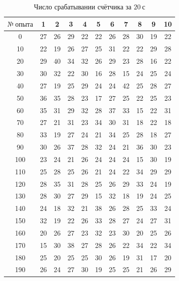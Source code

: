 \documentclass[a4paper, 12pt]{article}
\begin{document}
    \begin{table}[ht!]
    	\begin{center}
    		\begin{tabular}{|c|c|c|c|c|c|c|c|c|c|c|}
    			\hline
    			$№ \ опыта$ & 1  & 2  & 3  & 4  & 5  & 6  & 7  & 8  & 9  & 10 \\ \hline
    			     0      & 27 & 26 & 29 & 22 & 22 & 26 & 28 & 30 & 19 & 22 \\
    			    10      & 22 & 19 & 26 & 27 & 25 & 31 & 22 & 22 & 29 & 28 \\
    			    20      & 29 & 40 & 34 & 32 & 26 & 29 & 23 & 28 & 16 & 22 \\
    			    30      & 30 & 32 & 22 & 30 & 16 & 28 & 15 & 24 & 25 & 24 \\
    			    40      & 27 & 19 & 25 & 29 & 24 & 24 & 42 & 25 & 28 & 27 \\
    			    50      & 36 & 35 & 28 & 23 & 17 & 27 & 25 & 22 & 25 & 23 \\
    			    60      & 35 & 31 & 29 & 32 & 28 & 37 & 33 & 15 & 22 & 31 \\
    			    70      & 27 & 21 & 31 & 23 & 34 & 30 & 31 & 18 & 22 & 18 \\
    			    80      & 33 & 19 & 27 & 24 & 21 & 34 & 25 & 28 & 18 & 27 \\
    			    90      & 30 & 26 & 37 & 28 & 32 & 24 & 21 & 36 & 30 & 23 \\
    			    100     & 23 & 24 & 21 & 26 & 24 & 24 & 24 & 15 & 30 & 19 \\
    			    110     & 25 & 28 & 25 & 26 & 21 & 24 & 22 & 34 & 29 & 29 \\
    			    120     & 28 & 35 & 31 & 28 & 25 & 26 & 29 & 33 & 24 & 19 \\
    			    130     & 28 & 30 & 27 & 29 & 15 & 32 & 18 & 19 & 24 & 25 \\
    			    140     & 24 & 18 & 32 & 21 & 38 & 26 & 28 & 25 & 33 & 24 \\
    			    150     & 32 & 19 & 22 & 26 & 33 & 28 & 27 & 24 & 27 & 31 \\
    			    160     & 20 & 26 & 27 & 23 & 32 & 23 & 30 & 20 & 25 & 26 \\
    			    170     & 15 & 30 & 38 & 27 & 28 & 26 & 22 & 34 & 22 & 34 \\
    			    180     & 25 & 20 & 25 & 25 & 30 & 26 & 19 & 31 & 17 & 20 \\
    			    190     & 26 & 24 & 27 & 30 & 19 & 25 & 25 & 21 & 26 & 29 \\ \hline
    		\end{tabular}
    		\caption{Число срабатывании счётчика за $20 \ с$} \label{20c}
    	\end{center}
    \end{table}
\end{document}
